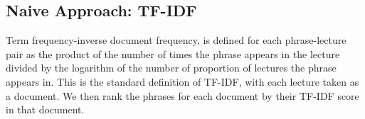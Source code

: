 \subsection{Naive Approach: TF-IDF}
\label{sec:tfidf}


Term frequency-inverse document frequency, is defined for each phrase-lecture pair as the product of the number of times the phrase appears in the lecture divided by the logarithm of the number of proportion of lectures the phrase appears in. This is the standard definition of TF-IDF, with each lecture taken as a document. We then rank the phrases for each document by their TF-IDF score in that document.


